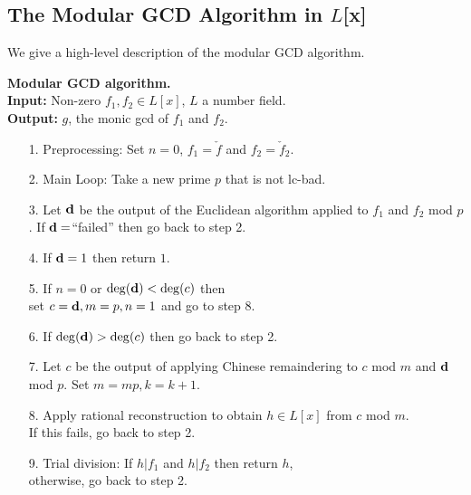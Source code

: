 \documentclass[10pt]{article}
\begin{document}
 
\subsection{The Modular GCD Algorithm in $L$[x]}

We give a high-level description of the modular GCD algorithm.

\noindent

\bigskip
\noindent
{\bf Modular GCD algorithm.} \\
{\bf Input:} Non-zero $f_1,f_2 \in L[x]$, $L$ a number field. \\
{\bf Output:} $g$, the monic gcd of $f_1$ and $f_2$. \\[-16pt]
\begin{itemize}
\item[1.] Preprocessing: Set $n=0$, $f_1=\check{f}$ and $f_2=\check{f}_2$.
\vspace*{-2mm}
\item[2.] Main Loop: Take a new prime $p$ that is not lc-bad.
\vspace*{-2mm}
\item[3.] Let ${\bf d}$ be the output of the Euclidean algorithm applied
          to $f_1$ and $f_2$ mod $p$.
          If ${\bf d} =$``failed'' then go back to step 2.
\vspace*{-2mm}
\item[4.] If ${\bf d}=1$ then return $1$.
\vspace*{-2mm}
\item[5.] If $n=0$ or ${\rm deg}({\bf d}) < {\rm deg}(c)$ then \\
          set $c={\bf d}, m=p, n=1$ and go to step 8.
\vspace*{-2mm}
\item[6.] If ${\rm deg}({\bf d}) > {\rm deg}(c)$ then go back to step 2.
\vspace*{-2mm}
\item[7.] Let $c$ be the output of applying Chinese remaindering to $c$ mod $m$ and
          ${\bf d}$ mod $p$.  Set $m = mp, k = k+1$.
\vspace*{-2mm}
\item[8.] Apply rational reconstruction to obtain $h \in L[x]$ from $c$ mod $m$. \\
          If this fails, go back to step 2.
\vspace*{-2mm}
\item[9.] Trial division: If $h|f_1$ and $h|f_2$ then return $h$, \\
          otherwise, go back to step 2.
\end{itemize}
\end{document}
